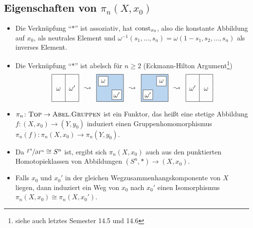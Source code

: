 \subsection{Eigenschaften von $\pi_n(X,x_0)$} %
\label{sub:1515}
\begin{itemize}
	\item Die Verknüpfung \enquote{$*$} ist assoziativ, hat $\mathrm{const}_{x_0}$, also die konstante Abbildung auf $x_0$, als neutrales Element und 
	$\omega ^{-1}(s_1,\ldots ,s_n)= \omega(1-s_1,s_2, \ldots ,s_n)$ als inverses Element.
	\item Die Verknüpfung \enquote{$*$} ist abelsch für $n \ge 2$ (Eckmann-Hilton Argument\footnote{siehe auch letztes Semester 14.5 und 14.6})
	\[
		\vcenter{\hbox{\begin{tikzpicture}[scale=1.4]
			\draw (0,0) rectangle (1,1);
			\draw (0.5,0) -- (0.5,1);
			\node at (0.25,0.5) {$\omega\vphantom{\omega^\prime}$};
			\node at (0.75,0.5) {$\omega^\prime$};
		\end{tikzpicture}}}
		\enspace\leadsto\enspace	
		\vcenter{\hbox{\begin{tikzpicture}[scale=1.4, every node/.style={draw,minimum size=5mm,inner sep=2pt,fill=white}]
			\draw[fill=DodgerBlue3!30] (0,0) rectangle (1,1);
			\node at (0.25,0.75) {$\omega$};
			\node at (0.75,0.25) {$\omega^\prime$};
		\end{tikzpicture}}}
		\enspace\leadsto\enspace
		\vcenter{\hbox{\begin{tikzpicture}[scale=1.4, every node/.style={draw,minimum size=5mm,inner sep=2pt,fill=white}]
			\draw[fill=DodgerBlue3!30] (0,0) rectangle (1,1);
			\node at (0.75,0.75) {$\omega$};
			\node at (0.25,0.25) {$\omega^\prime$};
		\end{tikzpicture}}}
		\enspace\leadsto\enspace
		\vcenter{\hbox{\begin{tikzpicture}[scale=1.4]
			\draw (0,0) rectangle (1,1);
			\draw (0.5,0) -- (0.5,1);
			\node at (0.25,0.5) {$\omega^\prime$};
			\node at (0.75,0.5) {$\omega\vphantom{\omega^\prime}$};
		\end{tikzpicture}}}	
	\]
	\item $\pi_n\colon \textsc{Top}  \to \textsc{Abel.Gruppen}$ ist ein Funktor, das heißt eine stetige Abbildung $f \colon (X,x_0) \to (Y,y_0)$ induziert einen Gruppenhomomorphismus 
	$\pi_n(f) \colon \pi_n(X,x_0) \to \pi_n(Y,y_0)$.
	\item Da $\nicefrac{I^n}{\partial I^n} \cong S^n$ ist, ergibt sich $\pi_n(X,x_0)$ auch aus den punktierten Homotopieklassen von Abbildungen $(S^n,*) \to (X,x_0)$.
	\item Falls $x_0$ und $x_0'$ in der gleichen Wegzusammenhangskomponente von $X$ liegen, dann induziert ein Weg von $x_0$ nach $x_0'$ einen Isomorphismus
	$\pi_n(X,x_0) \cong \pi_n(X,x_0')$.
\end{itemize}

